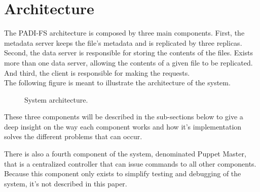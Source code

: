 \section{Architecture}

The PADI-FS architecture is composed by three main components. First, the
metadata server keeps the file's metadata and is replicated by three
replicas. Second, the data server is responsible for storing the contents
of the files. Exists more than one data server, allowing the contents of
a given file to be replicated. And third, the client is responsible for
making the requests.\\

The following figure is meant to illustrate the architecture of the system.\\

\begin{figure}[h]
   \caption{System architecture.}
\end{figure}

These three components will be described in the sub-sections below to give
a deep insight on the way each component works and how it's implementation
solves the different problems that can occur.

There is also a fourth component of the system, denominated Puppet Master,
that is a centralized controller that can issue commands to all other
components. Because this component only exists to simplify testing and
debugging of the system, it's not described in this paper.





